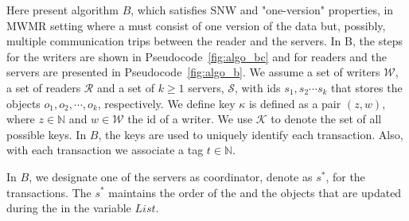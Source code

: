Here present  algorithm  $B$, which satisfies  SNW and "one-version" properties, in MWMR setting where a \rot{} must consist of one version of the data but, possibly, multiple communication trips between the reader and the servers.%
In B, the steps for the writers are shown in Pseudocode~\ref{fig:algo_bc} and for readers and the servers  are presented in Pseudocode~\ref{fig:algo_b}.
We assume  a set of writers $\mathcal{W}$,  a set of readers $\mathcal{R}$ and a set of $k \geq 1$ servers,  $\mathcal{S}$, with ids $s_1, s_2\cdots s_k$ that stores the objects $o_1, o_2, \cdots, o_k$, respectively.  We define  key ${\kappa}$ is defined as a pair $(z, w)$, 
where $z \in \mathbb{N}$ and $w \in \mathcal{W}$ the  id of a writer. We use $\mathcal{K}$ to denote the set of all possible keys. 
In $B$, the keys are used to uniquely identify each transaction. Also, with each transaction we associate a tag $t \in \mathbb{N}$. 
	
In  $B$, we designate one of the servers as coordinator, denote as $s^*$,
 for the transactions. The $s^*$  maintains the order of the \wots{} and the objects that are updated during the \wot{} in the variable $List$.  %

